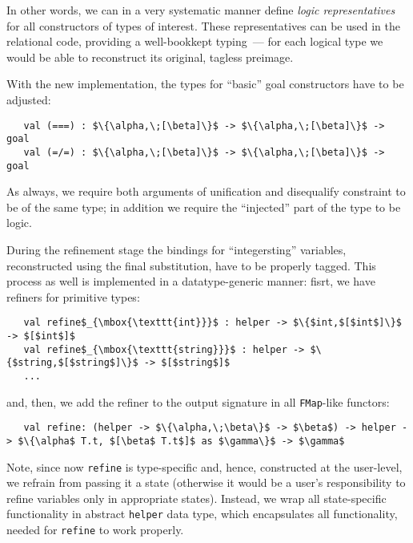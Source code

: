 In other words, we can in a very systematic manner define \emph{logic representatives} for all constructors
of types of interest. These representatives can be used in the relational code, providing a well-bookkept
typing~--- for each logical type we would be able to reconstruct its original, tagless preimage. 

With the new implementation, the types for ``basic'' goal constructors have to be adjusted:

\begin{lstlisting}
   val (===) : $\{\alpha,\;[\beta]\}$ -> $\{\alpha,\;[\beta]\}$ -> goal
   val (=/=) : $\{\alpha,\;[\beta]\}$ -> $\{\alpha,\;[\beta]\}$ -> goal
\end{lstlisting}

As always, we require both arguments of unification and disequalify constraint to be of the same type; in addition
we require the ``injected'' part of the type to be logic.

During the refinement stage the bindings for ``integersting'' variables, reconstructed using the final
substitution, have to be properly tagged. This process as well is implemented in a datatype-generic manner:
fisrt, we have refiners for primitive types:

\begin{lstlisting}
   val refine$_{\mbox{\texttt{int}}}$ : helper -> $\{$int,$[$int$]\}$ -> $[$int$]$
   val refine$_{\mbox{\texttt{string}}}$ : helper -> $\{$string,$[$string$]\}$ -> $[$string$]$
   ...  
\end{lstlisting}

and, then, we add the refiner to the output signature in all \lstinline{FMap}-like functors:

\begin{lstlisting}
   val refine: (helper -> $\{\alpha,\;\beta\}$ -> $\beta$) -> helper -> $\{\alpha$ T.t, $[\beta$ T.t$]$ as $\gamma\}$ -> $\gamma$
\end{lstlisting}

Note, since now \lstinline{refine} is type-specific and, hence, constructed at the user-level, we refrain from passing 
it a state (otherwise it would be a user's responsibility to refine variables only in appropriate states). 
Instead, we wrap all state-specific functionality in abstract \lstinline{helper} data type, which encapsulates
all functionality, needed for \lstinline{refine} to work properly.
